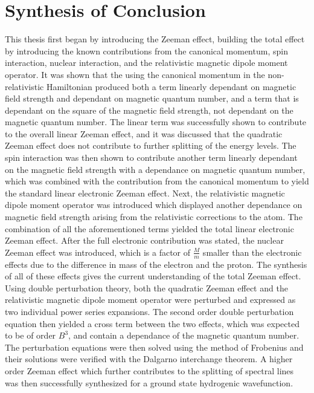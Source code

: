     \section{Synthesis of Conclusion}\label{sec:Synthesis}
        This thesis first began by introducing the Zeeman effect, building the total effect by introducing the known contributions from the canonical momentum, spin interaction, nuclear interaction, and the relativistic magnetic dipole moment operator. It was shown that the using the canonical momentum in the non-relativistic Hamiltonian produced both a term linearly dependant on magnetic field strength and dependant on magnetic quantum number, and a term that is dependant on the square of the magnetic field strength, not dependant on the magnetic quantum number. The linear term was successfully shown to contribute to the overall linear Zeeman effect, and it was discussed that the quadratic Zeeman effect does not contribute to further splitting of the energy levels. The spin interaction was then shown to contribute another term linearly dependant on the magnetic field strength with a dependance on magnetic quantum number, which was combined with the contribution from the canonical momentum to yield the standard linear electronic Zeeman effect. Next, the relativistic magnetic dipole moment operator was introduced which displayed another dependance on magnetic field strength arising from the relativistic corrections to the atom. The combination of all the aforementioned terms yielded the total linear electronic Zeeman effect. After the full electronic contribution was stated, the nuclear Zeeman effect was introduced, which is a factor of $\frac{M}{m}$ smaller than the electronic effects due to the difference in mass of the electron and the proton. The synthesis of all of these effects gives the current understanding of the total Zeeman effect. Using double perturbation theory, both the quadratic Zeeman effect and the relativistic magnetic dipole moment operator were perturbed and expressed as two individual power series expansions. The second order double perturbation equation then yielded a cross term between the two effects, which was expected to be of order $B^3$, and contain a dependance of the magnetic quantum number. The perturbation equations were then solved using the method of Frobenius and their solutions were verified with the Dalgarno interchange theorem. A higher order Zeeman effect which further contributes to the splitting of spectral lines was then successfully synthesized for a ground state hydrogenic wavefunction.\\

